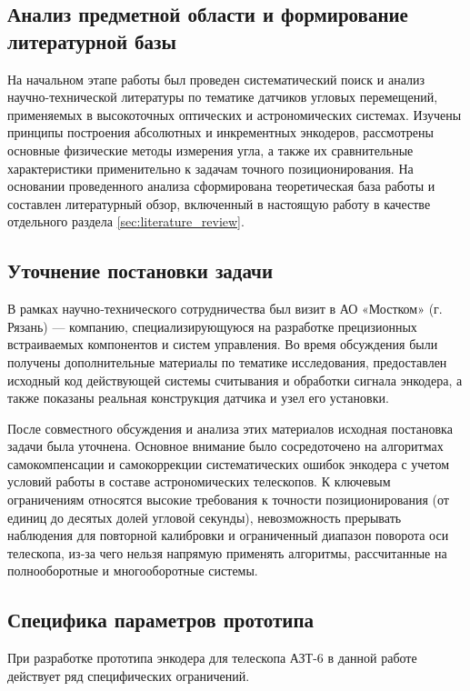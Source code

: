 \subsection{Анализ предметной области и формирование литературной базы}

На начальном этапе работы был проведен систематический поиск и анализ научно-технической литературы по тематике датчиков угловых перемещений, применяемых в высокоточных оптических и астрономических системах. Изучены принципы построения абсолютных и инкрементных энкодеров, рассмотрены основные физические методы измерения угла, а также их сравнительные характеристики применительно к задачам точного позиционирования. На основании проведенного анализа сформирована теоретическая база работы и составлен литературный обзор, включенный в настоящую работу в качестве отдельного раздела \ref{sec:literature_review}.

\subsection{Уточнение постановки задачи}
В рамках научно‑технического сотрудничества был визит в АО «Мостком» (г. Рязань) --- компанию, специализирующуюся на разработке прецизионных встраиваемых компонентов и систем управления. Во время обсуждения были получены дополнительные материалы по тематике исследования, предоставлен исходный код действующей системы считывания и обработки сигнала энкодера, а также показаны реальная конструкция датчика и узел его установки.

После совместного обсуждения и анализа этих материалов исходная постановка задачи была уточнена. Основное внимание было сосредоточено на алгоритмах самокомпенсации и самокоррекции систематических ошибок энкодера с учетом условий работы в составе астрономических телескопов. К ключевым ограничениям относятся высокие требования к точности позиционирования (от единиц до десятых долей угловой секунды), невозможность прерывать наблюдения для повторной калибровки и ограниченный диапазон поворота оси телескопа, из‑за чего нельзя напрямую применять алгоритмы, рассчитанные на полнооборотные и многооборотные системы.

\subsection{Специфика параметров прототипа}

При разработке прототипа энкодера для телескопа АЗТ-6 в данной работе действует ряд специфических ограничений.


